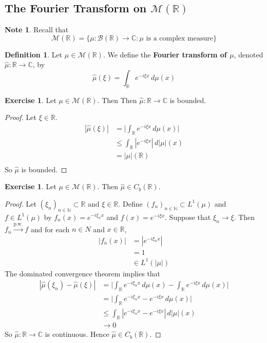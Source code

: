 \documentclass[12pt]{amsart}
\theoremstyle{definition}
\newtheorem{defn}[definition]{Definition}
\newtheorem{note}[definition]{Note}
\newtheorem{ex}[definition]{Exercise}
\newcommand{\C}{\mathbb{C}}
\newcommand{\N}{\mathbb{N}}
\newcommand{\R}{\mathbb{R}}
\newcommand{\MB}{\mathcal{B}}
\newcommand{\MM}{\mathcal{M}}
\newcommand{\dmu}{\, d \mu}
\newcommand{\convt}[1]{\xrightarrow{\text{#1}}}
\begin{document}
	
	
	
	
	
	\newpage
	\subsection{The Fourier Transform on $\MM(\R)$}
	
	\begin{note}
		Recall that $$\MM(\R) = \{\mu: \MB(\R) \rightarrow \C: \mu \text{ is a complex measure}\}$$
	\end{note}
	
	\begin{defn}
		Let $\mu \in \MM(\R)$. We define the \textbf{Fourier transform of $\mu$}, denoted $\hat{\mu}: \R \rightarrow \C$, by
		$$\hat{\mu}(\xi) = \int_{\R} e^{-i \xi x} \dmu(x)$$ 
	\end{defn}
	
	\begin{ex}
		Let $\mu \in \MM(\R)$. Then Then $\hat{\mu} : \R \rightarrow \C$ is bounded.
	\end{ex}
	
	\begin{proof}
		Let $\xi \in \R$. 
		\begin{align*}
			|\hat{\mu}(\xi)|
			& = \bigg | \int_{\R} e^{-i \xi x} \dmu(x) \bigg| \\
			& \leq \int_{\R} |e^{-i \xi x}| \, d|\mu|(x) \\
			& = |\mu|(\R) \\
		\end{align*}
		So $\hat{\mu}$ is bounded.
	\end{proof}
	
	\begin{ex}
		Let $\mu \in \MM(\R)$. Then $\hat{\mu} \in C_b(\R)$.
	\end{ex}
	
	\begin{proof}
		Let $(\xi_{n})_{n \in \N} \subset \R$ and $\xi \in \R$. Define $(f_n)_{n \in \N} \subset L^1 (\mu)$ and $f \in L^1(\mu)$ by $f_n(x) = e^{-i \xi_n x}$ and $f(x) = e^{-i \xi x}$. Suppose that $\xi_n \rightarrow \xi$. Then $f_n \convt{p.w.} f$ and for each $n \in N$ and $x \in \R$, 
		\begin{align*}
			|f_n(x)|
			&= |e^{-i \xi_n x}| \\
			& = 1 \\
			& \in L^1(|\mu|)
		\end{align*}
		The dominated convergence theorem implies that
		\begin{align*}
			|\hat{\mu}(\xi_n) - \hat{\mu}(\xi)| 
			& = \bigg| \int_{\R} e^{-i \xi_n x} \dmu(x) - \int_{\R} e^{-i \xi x} \dmu(x)\bigg| \\
			& =  \bigg| \int_{\R} e^{-i \xi_n x} - e^{-i \xi x} \dmu(x) \bigg| \\
			& \leq \int_{\R} |e^{-i \xi_n x} - e^{-i \xi x}| \, d|\mu|(x) \\
			& \rightarrow 0
		\end{align*}
		So $\hat{\mu}: \R \rightarrow \C$ is continuous. Hence $\hat{\mu} \in C_b(\R)$.
	\end{proof}
	
\end{document}
